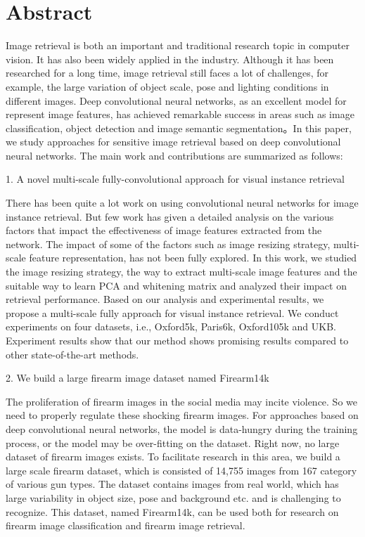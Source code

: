 
\chapter{Abstract}
Image retrieval is both an important and traditional research topic in computer vision. It has also been widely applied in the industry. Although it has been researched for a long time, image retrieval still faces a lot of challenges, for example, the large variation of object scale, pose and lighting conditions in different images. Deep convolutional neural networks, as an excellent model for represent image features, has achieved remarkable success in areas such as image classification, object detection and image semantic segmentation。In this paper, we study approaches for sensitive image retrieval based on deep convolutional neural networks. The main work and contributions are summarized as follows:

1. A novel multi-scale fully-convolutional approach for visual instance retrieval

There has been quite a lot work on using convolutional neural networks for image instance retrieval. But few work has given a detailed analysis on the various factors that impact the effectiveness of image features extracted from the network. The impact of some of the factors such as image resizing strategy, multi-scale feature representation, has not been fully explored. In this work, we studied the image resizing strategy, the way to extract multi-scale image features and the suitable way to learn PCA and whitening matrix and analyzed their impact on retrieval performance. Based on our analysis and experimental results, we propose a multi-scale fully approach for visual instance retrieval. We conduct experiments on four datasets, i.e., Oxford5k, Paris6k, Oxford105k and UKB. Experiment results show that our method shows promising results compared to other state-of-the-art methods.

2. We build a large firearm image dataset named Firearm14k

The proliferation of firearm images in the social media may incite violence. So we need to properly regulate these shocking firearm images. For approaches based on deep convolutional neural networks, the model is data-hungry during the training process, or the model may be over-fitting on the dataset. Right now, no large dataset of firearm images exists. To facilitate research in this area, we build a large scale firearm dataset, which is consisted of 14,755 images from 167 category of various gun types. The dataset contains images from real world, which has large variability in object size, pose and background etc. and is challenging to recognize. This dataset, named Firearm14k, can be used both for research on firearm image classification and firearm image retrieval.

